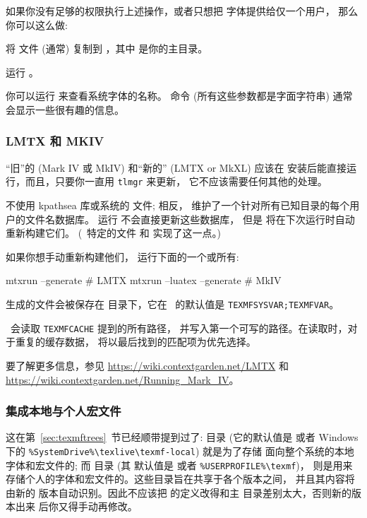 \documentclass{article}
\begin{document}
如果你没有足够的权限执行上述操作，或者只想把 \TL{} 字体提供给仅一个用户，
那么你可以这么做: 
\begin{enumerate*}
\item 将  文件 (通常) 复制到
      ，其中 \filename{~} 是你的主目录。
\item 运行 。
\end{enumerate*}

你可以运行  来查看系统字体的名称。
命令  (所有这些参数都是字面字符串) 通常会显示一些很有趣的信息。

\subsubsection{\protect\ConTeXt{} LMTX 和 MKIV}
\label{sec:context} %
\label{sec:context-mkiv}

“旧”的 \ConTeXt{} (Mark IV 或 MkIV) 和“新的” \ConTeXt{} (LMTX or MkXL)
应该在 \TL{} 安装后能直接运行，而且，只要你一直用 \verb+tlmgr+ 来更新，
它不应该需要任何其他的处理。

\ConTeXt{} 不使用 kpathsea 库或系统的  文件; 
相反，\ConTeXt{} 维护了一个针对所有已知目录的每个用户的文件名数据库。
运行  不会直接更新这些数据库，
但是 \ConTeXt{} 将在下次运行时自动重新构建它们。
(\TL\ 特定的文件  和  实现了这一点。)

如果你想手动重新构建他们，
运行下面的一个或所有: 
\begin{sverbatim}
mtxrun --generate           # LMTX
mtxrun --luatex --generate  # MkIV
\end{sverbatim}
生成的文件会被保存在  目录下，它在 \TL\
的默认值是 \verb+TEXMFSYSVAR;TEXMFVAR+。

\ConTeXt\ 会读取 \verb+TEXMFCACHE+ 提到的所有路径，
并写入第一个可写的路径。在读取时，对于重复的缓存数据，
将以最后找到的匹配项为优先选择。

要了解更多信息，参见
\url{https://wiki.contextgarden.net/LMTX} 和 \url{https://wiki.contextgarden.net/Running_Mark_IV}。

\subsubsection{集成本地与个人宏文件}
\label{sec:local-personal-macros}

这在第~\ref{sec:texmftrees}~节已经顺带提到过了: 
目录 (它的默认值是  或者
Windows 下的 \verb|%SystemDrive%\texlive\texmf-local|) 就是为了存储
面向整个系统的本地字体和宏文件的; 而  目录 (其
默认值是  或者 \verb|%USERPROFILE%\texmf|)，
则是用来存储个人的字体和宏文件的。这些目录旨在共享于各个版本之间，
并且其内容将由新的 \TL{} 版本自动识别。因此不应该把
 的定义改得和主 \TL{} 目录差别太大，否则新的版本出来
后你又得手动再修改。
\end{document}
